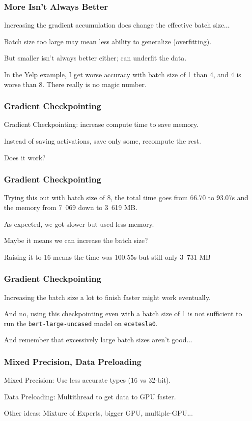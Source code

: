 \begin{frame}
\frametitle{More Isn't Always Better}

Increasing the gradient accumulation does change the effective batch size...

Batch size too large may mean less ability to generalize (overfitting).

But smaller isn't always better either; can underfit the data.

In the Yelp example, I get worse accuracy with batch size of 1 than 4, and 4 is worse than 8. There really is no magic number.


\end{frame}

\begin{frame}
\frametitle{Gradient Checkpointing}

\alert{Gradient Checkpointing}: increase compute time to save memory.

Instead of saving activations, save only some, recompute the rest.

Does it work?

\end{frame}

\begin{frame}
\frametitle{Gradient Checkpointing}

Trying this out with batch size of 8, the total time goes from 66.70 to 93.07s and the memory from 7~069 down to 3~619 MB. 

As expected, we got slower but used less memory. 

Maybe it means we can increase the batch size? 

Raising it to 16 means the time was  100.55s but still only 3~731 MB


\end{frame}

\begin{frame}
\frametitle{Gradient Checkpointing}

Increasing the batch size a lot to finish faster might work eventually. 

And no, using this checkpointing even with a batch size of 1 is not sufficient to run the \texttt{bert-large-uncased} model on \texttt{ecetesla0}.

And remember that excessively large batch sizes aren't good...

\end{frame}

\begin{frame}
\frametitle{Mixed Precision, Data Preloading}

\alert{Mixed Precision}: Use less accurate types (16 vs 32-bit).

\alert{Data Preloading}: Multithread to get data to GPU faster.

Other ideas: Mixture of Experts, bigger GPU, multiple-GPU...

\end{frame}

